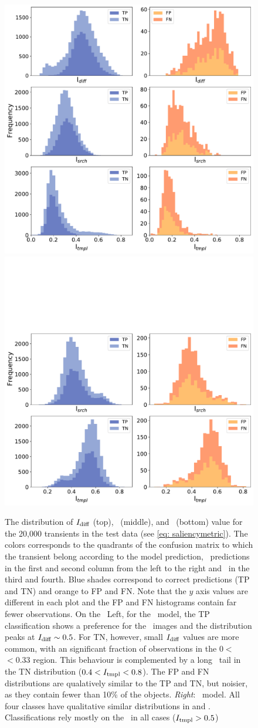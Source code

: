 \begin{figure}
    \centering
    \includegraphics[width=0.45\linewidth]{
    figures/histogram_sm_important_pixels_NERSC100K20KNERSCstam0-9CCCC_3s3DH.pdf}
    \includegraphics[width=0.45\linewidth]{
    figures/histogram_sm_important_pixels_NERSC100K20KNERSCstam0-9CCCC_3s2DH.pdf}
    \caption{The distribution of  $I_\mathrm{diff}$ (top), \isearch\ (middle), and \itempl\ (bottom) value for the 20,000 transients in the test data (see \autoref{eq: saliencymetric}). The colors corresponds to the quadrants of the confusion matrix to which the transient belong according to the model prediction, \diabased\ predictions in the first and second column from the left to the right and \nodia\ in the third and fourth. Blue shades correspond to correct predictions (TP and TN) and orange to FP and FN. Note that the $y$ axis values are different in each plot and the FP and FN histograms contain far fewer observations. On the {\itempl\ Left}, for the \diabased\ model, the TP classification shows a preference for the \diff\ images and the distribution peaks at $I_\mathrm{diff} \sim 0.5$. For TN, however, small $I_\mathrm{diff}$ values are more common, with an significant fraction of observations in the $0<$\idiff$<0.33$ region. This behaviour is complemented by a long \itempl\ tail in the TN distribution ($0.4<I_\mathrm{tmpl}<0.8$). The FP and FN distributions are qualatively similar to the TP and TN, but noisier, as they contain fewer than 10\% of the objects. {\it Right}: \nodia\ model. All four classes have qualitative similar distributions in \itempl and \isearch. Classifications rely mostly on the \temp\ in all cases ($I_\mathrm{tmpl} > 0.5$)}
    \label{fig:histo_saliency}
\end{figure}


